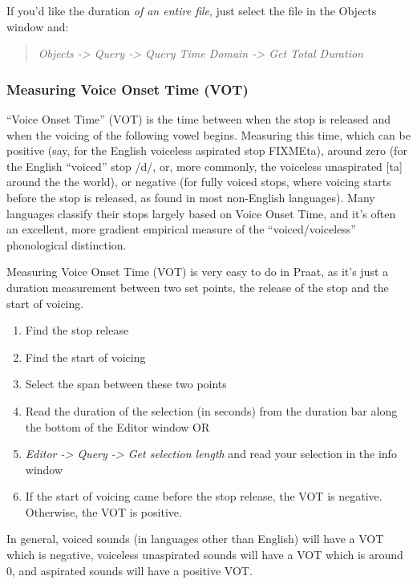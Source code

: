\documentclass[11pt]{article}
\def\tightlist{}
\begin{document}
If you'd like the duration \emph{of an entire file}, just select the
file in the Objects window and:

\begin{quote}
\emph{Objects -\textgreater{} Query -\textgreater{} Query Time Domain
-\textgreater{} Get Total Duration}
\end{quote}

\hypertarget{measuring-voice-onset-time-vot}{%
\subsubsection{Measuring Voice Onset Time
(VOT)}\label{measuring-voice-onset-time-vot}}

``Voice Onset Time'' (VOT) is the time between when the stop is released
and when the voicing of the following vowel begins. Measuring this time,
which can be positive (say, for the English voiceless aspirated stop
FIXMEta), around zero (for the English ``voiced'' stop /d/, or, more
commonly, the voiceless unaspirated {[}ta{]} around the the world), or
negative (for fully voiced stops, where voicing starts before the stop
is released, as found in most non-English languages). Many languages
classify their stops largely based on Voice Onset Time, and it's often
an excellent, more gradient empirical measure of the
``voiced/voiceless'' phonological distinction.

Measuring Voice Onset Time (VOT) is very easy to do in Praat, as it's
just a duration measurement between two set points, the release of the
stop and the start of voicing.

\begin{enumerate}
\def\labelenumi{\arabic{enumi}.}
\tightlist
\item
  Find the stop release
\item
  Find the start of voicing
\item
  Select the span between these two points
\item
  Read the duration of the selection (in seconds) from the duration bar
  along the bottom of the Editor window OR
\item
  \emph{Editor -\textgreater{} Query -\textgreater{} Get selection
  length} and read your selection in the info window
\item
  If the start of voicing came before the stop release, the VOT is
  negative. Otherwise, the VOT is positive.
\end{enumerate}

In general, voiced sounds (in languages other than English) will have a
VOT which is negative, voiceless unaspirated sounds will have a VOT
which is around 0, and aspirated sounds will have a positive VOT.
\end{document}

